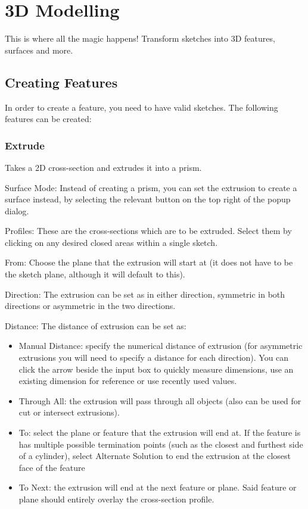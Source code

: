 \section{3D Modelling}

This is where all the magic happens! Transform sketches into 3D features, surfaces and more.

\subsection{Creating Features}
In order to create a feature, you need to have valid sketches. The following features can be created:

\subsubsection{Extrude}
Takes a 2D cross-section and extrudes it into a prism. 

Surface Mode:
Instead of creating a prism, you can set the extrusion to create a surface instead, by selecting the relevant button on the top right of the popup dialog.

Profiles:
These are the cross-sections which are to be extruded. Select them by clicking on any desired closed areas within a single sketch.

From:
Choose the plane that the extrusion will start at (it does not have to be the sketch plane, although it will default to this).

Direction:
The extrusion can be set as in either direction, symmetric in both directions or asymmetric in the two directions.

Distance:
The distance of extrusion can be set as:

\begin{itemize}
    \item Manual Distance: specify the numerical distance of extrusion (for asymmetric extrusions you will need to specify a distance for each direction). You can click the arrow beside the input box to quickly measure dimensions, use an existing dimension for reference or use recently used values.
    \item Through All: the extrusion will pass through all objects (also can be used for cut or intersect extrusions).
    \item To: select the plane or feature that the extrusion will end at. If the feature is has multiple possible termination points (such as the closest and furthest side of a cylinder), select Alternate Solution to end the extrusion at the closest face of the feature
    \item To Next: the extrusion will end at the next feature or plane. Said feature or plane should entirely overlay the cross-section profile.
\end{itemize}

